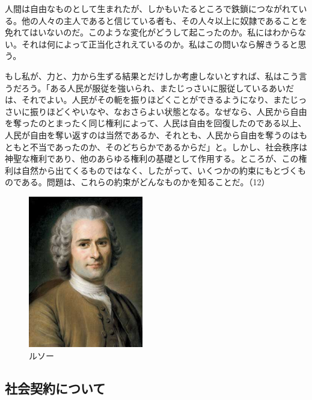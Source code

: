 

人間は自由なものとして生まれたが、しかもいたるところで鉄鎖につながれている。他の人々の主人であると信じている者も、その人々以上に奴隷であることを免れてはいないのだ。このような変化がどうして起こったのか。私にはわからない。それは何によって正当化されえているのか。私はこの問いなら解きうると思う。

もし私が、力と、力から生ずる結果とだけしか考慮しないとすれば、私はこう言うだろう。「ある人民が服従を強いられ、またじっさいに服従しているあいだは、それでよい。人民がその軛を振りほどくことができるようになり、またじっさいに振りほどくやいなや、なおさらよい状態となる。なぜなら、人民から自由を奪ったのとまったく同じ権利によって、人民は自由を回復したのである以上、人民が自由を奪い返すのは当然であるか、それとも、人民から自由を奪うのはもともと不当であったのか、そのどちらかであるからだ」と。しかし、社会秩序は神聖な権利であり、他のあらゆる権利の基礎として作用する。ところが、この権利は自然から出てくるものではなく、したがって、いくつかの約束にもとづくものである。問題は、これらの約束がどんなものかを知ることだ。（12）

 \begin{figure}[htbp]
   \centering
     \includegraphics[width=50mm]{images/rousseau.jpg}
   
   \caption{ルソー}
 \end{figure}



\subsection{社会契約について}




